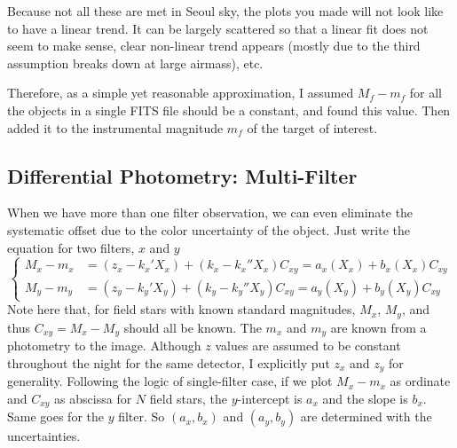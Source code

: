 Because not all these are met in Seoul sky, the plots you made will not look like to have a linear trend. It can be largely scattered so that a linear fit does not seem to make sense, clear non-linear trend appears (mostly due to the third assumption breaks down at large airmass), etc.

Therefore, as a simple yet reasonable approximation, I assumed $ M_f - m_f $ for all the objects in a single FITS file should be a constant, and found this value. Then added it to the instrumental magnitude $ m_f $ of the target of interest.


\subsection{Differential Photometry: Multi-Filter}
When we have more than one filter observation, we can even eliminate the systematic offset due to the color uncertainty of the object. Just write the equation for two filters, $ x $ and $ y $
\begin{equation}
\begin{cases}
  M_x - m_x &= (z_x - k_x' X_x) + (k_x - k_x''X_x) C_{xy} = a_x(X_x) + b_x(X_x) C_{xy} \\
  M_y - m_y &= (z_y - k_y' X_y) + (k_y - k_y''X_y) C_{xy} = a_y(X_y) + b_y(X_y) C_{xy} 
\end{cases}
\end{equation}
Note here that, for field stars with known standard magnitudes, $ M_x $, $ M_y $, and thus $ C_{xy} = M_x - M_y $ should all be known. The $ m_x $ and $ m_y $ are known from a photometry to the image. Although $ z $ values are assumed to be constant throughout the night for the same detector, I explicitly put $ z_x $ and $ z_y $ for generality. Following the logic of single-filter case, if we plot $ M_x - m_x $ as ordinate and $ C_{xy} $ as abscissa for $ N $ field stars, the $ y $-intercept is $ a_x $ and the slope is $ b_x $. Same goes for the $ y $ filter. So  $ (a_x, b_x) $ and $ (a_y, b_y) $ are determined with the uncertainties.

